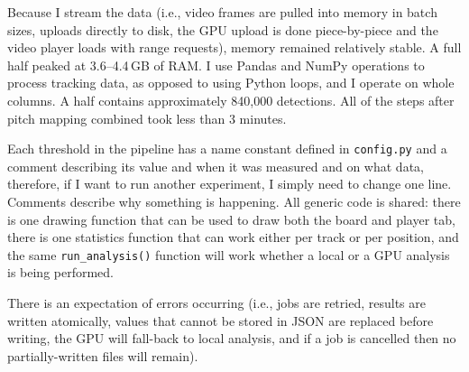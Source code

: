 Because I stream the data (i.e., video frames are pulled into memory in batch sizes, uploads directly to disk, the GPU upload is done piece-by-piece and the video player loads with range requests), memory remained relatively stable. A full half peaked at 3.6--4.4\,GB of RAM. I use Pandas and NumPy operations to process tracking data, as opposed to using Python loops, and I operate on whole columns. A half contains approximately 840,000 detections. All of the steps after pitch mapping combined took less than 3 minutes.

Each threshold in the pipeline has a name constant defined in \texttt{config.py} and a comment describing its value and when it was measured and on what data, therefore, if I want to run another experiment, I simply need to change one line. Comments describe why something is happening. All generic code is shared: there is one drawing function that can be used to draw both the board and player tab, there is one statistics function that can work either per track or per position, and the same \texttt{run\_\allowbreak{}analysis()} function will work whether a local or a GPU analysis is being performed.

There is an expectation of errors occurring (i.e., jobs are retried, results are written atomically, values that cannot be stored in JSON are replaced before writing, the GPU will fall-back to local analysis, and if a job is cancelled then no partially-written files will remain).
